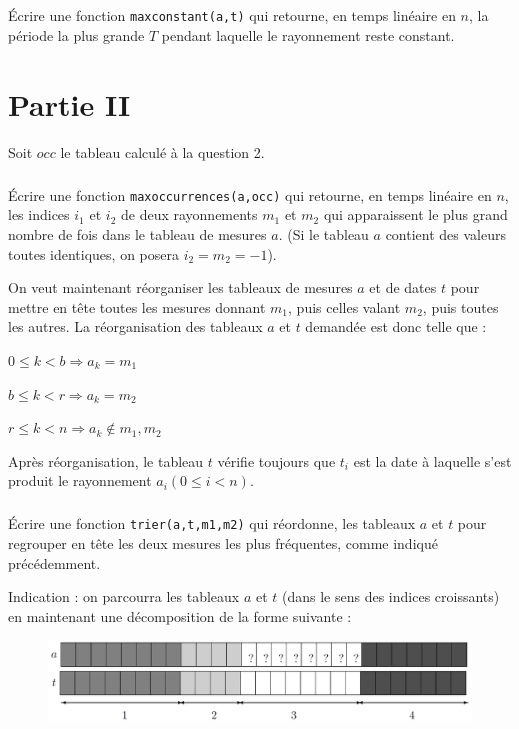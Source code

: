 \documentclass[10pt,fleqn]{article} %
\begin{document}
\subparagraph{} Écrire une fonction \texttt{maxconstant(a,t)} qui retourne, en temps linéaire en $n$, la période la plus grande $T$ pendant laquelle le rayonnement reste constant.




\section{Partie II}



Soit $occ$ le tableau calculé à la question 2.



\subparagraph{} Écrire une fonction \texttt{maxoccurrences(a,occ)} qui retourne, en temps linéaire en $n$, les indices $i_1$ et $i_2$ de deux rayonnements $m_1$ et $m_2$ qui apparaissent le plus grand nombre de fois dans le tableau de mesures $a$.
(Si le tableau $a$ contient des valeurs toutes identiques, on posera $i_2=m_2 = -1$).

On veut maintenant réorganiser les tableaux de mesures $a$ et de dates $t$ pour mettre en tête toutes les mesures donnant $m_1$, puis celles valant $m_2$, puis toutes les autres.
La réorganisation des tableaux $a$ et $t$ demandée est donc telle que :

$0\le k<b \Rightarrow a_k=m_1$

$b\le k<r \Rightarrow a_k=m_2$

$r\le k<n \Rightarrow a_k \notin {m_1,m_2}$

Après réorganisation, le tableau $t$ vérifie toujours que $t_i$ est la date à laquelle s’est produit le rayonnement $a_i (0 \le i < n)$.



\subparagraph{} Écrire une fonction \texttt{trier(a,t,m1,m2)} qui réordonne, les tableaux $a$ et $t$ pour regrouper en tête les deux mesures les plus fréquentes, comme indiqué précédemment.

Indication : on parcourra les tableaux $a$ et $t$ (dans le sens des indices croissants) en maintenant une décomposition de la forme suivante :

\begin{figure}[h]
\begin{center}
\includegraphics[scale=0.15]{images/Image1.jpg} 
\end{center}
\end{figure}
\end{document}
